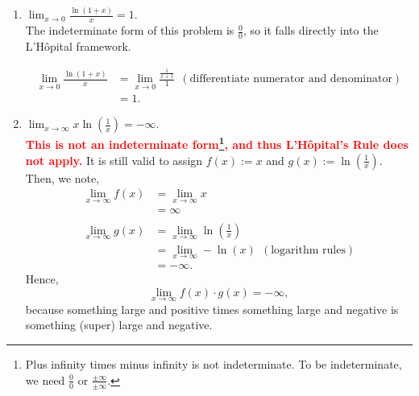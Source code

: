 \begin{enumerate}
    
    \item \Ans $\lim_{{x \to 0}} \frac{\ln(1+x)}{x} = 1$. \\

    The indeterminate form of this problem is $\frac{0}{0}$, so it falls directly into the L'H\^opital framework.
 
\begin{align*}
     \lim_{{x \to 0}} \frac{\ln(1+x)}{x}&=   \lim_{{x \to 0}} \frac{\frac{1}{x+1}}{1}~~ (\text{differentiate numerator and denominator})\\
     &=  1.
\end{align*}
    

\item \Ans $\displaystyle \lim_{{x \to \infty}} x \ln\left(\frac{1}{x}\right) = -\infty$.\\

\textcolor{red}{\bf This is not an indeterminate form\footnote{Plus infinity times minus infinity is not indeterminate. To be indeterminate, we need $\frac{0}{0}$ or $\frac{\pm \infty}{\pm \infty}$.}, and thus L'H\^opital's Rule does not apply.} It is still valid to assign $f(x) := x$ and $g(x) := \ln\left(\frac{1}{x}\right)$. Then, we note,
\begin{align*}
    \lim_{{x \to \infty}} f(x) & = \lim_{{x \to \infty}} x\\
    &= \infty\\
    \\
 \lim_{{x \to \infty}} g(x) & = \lim_{{x \to \infty}} \ln\left(\frac{1}{x}\right) \\
 &= \lim_{{x \to \infty}} -\ln\left(x\right) ~~(\text{logarithm rules})\\
    &= - \infty.    
\end{align*}
Hence, 
$$\lim_{{x \to \infty}} f(x) \cdot g(x) = -\infty,$$
because something large and positive times something large and negative is something (super) large and negative.\\




\end{enumerate}
